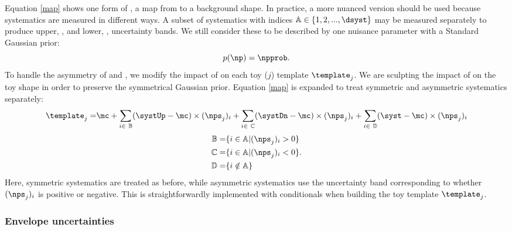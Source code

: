 Equation \ref{map} shows one form of \thetaToBkg, a map from \nps to a background shape. In practice, a more nuanced version should be used because systematics are measured in different ways.
A subset of systematics with indices $\mathbb{A}\in\{1,2,...,\dsyst\}$ may be measured separately to produce upper, \systUp, and lower, \systDn, uncertainty bands. We still consider these to be described by one nuisance parameter \np with a Standard Gaussian prior:
\begin{equation*}
   p(\np) = \npprob.
\end{equation*}
To handle the asymmetry of \systUp and \systDn, we modify the impact of \np on each toy ($j$) template $\template_j$. We are sculpting the impact of \np on the toy shape in order to preserve the symmetrical Gaussian prior. Equation \ref{map} is expanded to treat symmetric and asymmetric systematics separately:
\begin{equation}
\begin{split}
   \template_j =& \mc + \sum_{i\in~\mathbb{B}}(\systUp-\mc)\times(\nps_j)_i + \sum_{i\in~\mathbb{C}}(\systDn-\mc)\times(\nps_j)_i + \sum_{i\in~\mathbb{D}}(\syst-\mc)\times(\nps_j)_i \\
\end{split}
\end{equation}
\vspace{-1em}
\begin{equation*}
\begin{split}
   \mathbb{B}           =& \{i\in \mathbb{A}|(\nps_j)_i>0\} \\
   \mathbb{C}           =& \{i\in \mathbb{A}|(\nps_j)_i<0\} \\
   \mathbb{D}           =& \{i\notin \mathbb{A}\} \\
\end{split}.
\end{equation*}
Here, symmetric systematics are treated as before, while asymmetric systematics use the uncertainty band corresponding to whether $(\nps_j)_i$ is positive or negative.
This is straightforwardly implemented with conditionals when building the toy template $\template_j$.

\subsubsection*{Envelope uncertainties}

